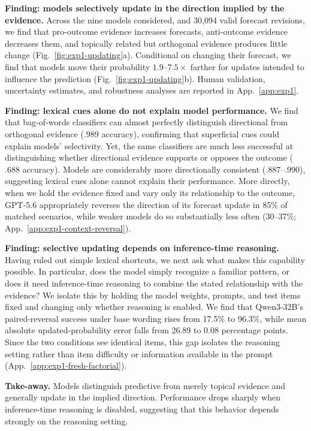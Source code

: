 \documentclass{article}
\begin{document}
\noindent\textbf{Finding: models selectively update in the direction implied by the evidence.}
Across the nine models considered, and 30,094 valid forecast revisions, we find that pro-outcome evidence increases forecasts, anti-outcome evidence decreases them, and topically related but orthogonal evidence produces little change (Fig.~\ref{fig:exp1-updating}a).
Conditional on changing their forecast, we find that models move their probability $1.9$--$7.5\times$ farther for updates intended to influence the prediction (Fig.~\ref{fig:exp1-updating}b).
Human validation, uncertainty estimates, and robustness analyses are reported in App.~\ref{app:exp1}.

\noindent\textbf{Finding: lexical cues alone do not explain model performance.}
We find that bag-of-words classifiers can almost perfectly distinguish directional from orthogonal evidence ($.989$ accuracy), confirming that superficial cues could explain models' selectivity.
Yet, the same classifiers are much less successful at distinguishing whether directional evidence supports or opposes the outcome ($.688$ accuracy).
Models are considerably more directionally consistent ($.887$--$.990$), suggesting lexical cues alone cannot explain their performance.
More directly, when we hold the evidence fixed and vary only its relationship to the outcome, GPT-5.6 appropriately reverses the direction of its forecast update in 85\% of matched scenarios, while weaker models do so substantially less often (30--37\%; App.~\ref{app:exp1-context-reversal}).

\noindent\textbf{Finding: selective updating depends on inference-time reasoning.}
Having ruled out simple lexical shortcuts, we next ask what makes this capability possible. In particular, does the model simply recognize a familiar pattern, or does it need inference-time reasoning to combine the stated relationship with the evidence? We isolate this by holding the model weights, prompts, and test items fixed and changing only whether reasoning is enabled. We find that Qwen3-32B's paired-reversal success under base wording rises from 17.5\% to 96.3\%, while mean absolute updated-probability error falls from 26.89 to 0.08 percentage points.
Since the two conditions see identical items, this gap isolates the reasoning setting rather than item difficulty or information available in the prompt (App.~\ref{app:exp1-fresh-factorial}).

\noindent\textbf{Take-away.}
Models distinguish predictive from merely topical evidence and generally update in the implied direction. Performance drops sharply when inference-time reasoning is disabled, suggesting that this behavior depends strongly on the reasoning setting.
\end{document}
